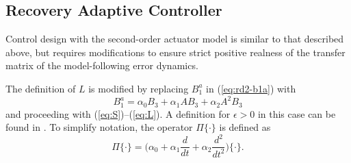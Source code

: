 \subsection{Recovery Adaptive Controller}
Control design with the second-order actuator model is similar to that described above, but requires modifications to ensure strict positive realness of the transfer matrix of the model-following error dynamics. 

The definition of $L$ is modified by replacing $B_1^a$ in (\ref{eq:rd2-b1a}) with
\begin{equation}
B_1^a = \alpha_0 B_3 + \alpha_1 A B_3 + \alpha_2 A^2 B_3 \label{eq:rd3-b1a}
\end{equation}
and proceeding with (\ref{eq:S})--(\ref{eq:L}). A definition for $\epsilon>0$ in this case can be found in \cite{qu2016phd}. To simplify notation, the operator $\Pi \{\cdot \}$ is defined as
\begin{equation}
\Pi \{ \cdot \} = \big( \alpha_0 + \alpha_1 \frac{d}{dt} + \alpha_2 \frac{d^2}{dt^2} \big) \{ \cdot \}.
\end{equation}

